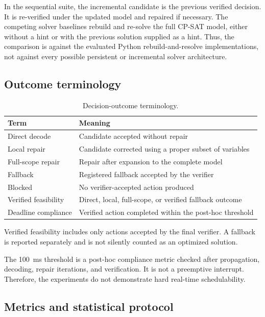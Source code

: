 \documentclass[pdflatex,sn-mathphys-num,iicol,oneside]{sn-jnl}
\newcommand{\cpsat}{\textsc{CP-SAT}\xspace}
\begin{document}
In the sequential suite, the incremental candidate is the previous
verified decision. It is re-verified under the updated model and
repaired if necessary. The competing solver baselines rebuild and
re-solve the full \cpsat model, either without a hint or with the
previous solution supplied as a hint. Thus, the comparison is against
the evaluated Python rebuild-and-resolve implementations, not against
every possible persistent or incremental solver architecture.

\subsection{Outcome terminology}

\begin{table}[t]
\centering
\caption{Decision-outcome terminology.}
\label{tab:terminology}
\setlength{\tabcolsep}{4pt}
\small
\begin{tabular}{ll}
\toprule
Term & Meaning\\
\midrule
Direct decode & Candidate accepted without repair\\
Local repair & Candidate corrected using a proper subset of variables\\
Full-scope repair & Repair after expansion to the complete model\\
Fallback & Registered fallback accepted by the verifier\\
Blocked & No verifier-accepted action produced\\
Verified feasibility & Direct, local, full-scope, or verified fallback outcome\\
Deadline compliance & Verified action completed within the post-hoc threshold\\
\bottomrule
\end{tabular}
\end{table}

Verified feasibility includes only actions accepted by the final
verifier. A fallback is reported separately and is not silently
counted as an optimized solution.

The 100~ms threshold is a post-hoc compliance metric checked after
propagation, decoding, repair iterations, and verification. It is not
a preemptive interrupt. Therefore, the experiments do not demonstrate
hard real-time schedulability.

\subsection{Metrics and statistical protocol}
\end{document}

